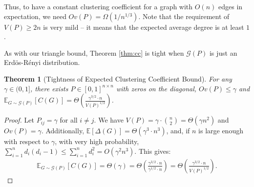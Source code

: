 \documentclass{article}
\newtheorem{theorem}{Theorem}
\newcommand{\E}{\mathbb{E}}
\begin{document}
Thus, to have a constant clustering coefficient for a graph with $O(n)$ edges in expectation, we need $Ov(P) = \Omega(1/n^{1/3})$. Note that the requirement of $V(P) \ge 2 n$ is very mild -- it means that the expected average degree is at least $1$.

As with our triangle bound, Theorem \ref{thm:cc} is tight when $\mathcal{G}(P)$ is just an Erd\"{o}s-R\'{e}nyi distribution.
\begin{theorem}[Tightness of Expected Clustering Coefficient Bound]\label{thm:tightCC}
For any $\gamma \in (0,1]$, there exists $P \in [0,1]^{n \times n}$ with zeros on the diagonal, $Ov(P) \le \gamma$ and $\E_{G \sim \mathcal{G}(P)} [C(G)] = \Theta \left (\frac{\gamma^{3/2} \cdot n}{V(P)^{1/2}} \right )$.
 \end{theorem}
 \begin{proof}
Let $P_{ij} = \gamma$ for all $i \neq j$. We have $V(P) = \gamma \cdot {n \choose 2} = \Theta(\gamma n^2)$ and $Ov(P) =  \gamma$. Additionally,  %
 $\E[\Delta(G)] = \Theta(\gamma^3 \cdot n^3)$, and, if $n$ is large enough with respect to $\gamma$, with very high probability, $\sum_{i=1}^n d_i(d_i-1) \le \sum_{i=1}^n d_i^2 = O(\gamma^2 n^3)$. This gives:
 \begin{align*}
\E_{G \sim \mathcal{G}(P)} [C(G)] = \Theta (\gamma) = \Theta \left (\frac{\gamma^{3/2} \cdot  n}{\gamma^{1/2} \cdot n} \right ) = \Theta \left ( \frac{\gamma^{3/2} \cdot n}{V(P)^{1/2}} \right ).
 \end{align*}
 \end{proof}
 
\end{document}
